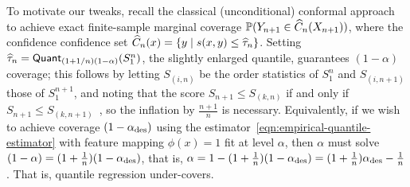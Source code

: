 \documentclass{article}
\newcommand{\scorefunc}{s}
\newcommand{\scoreval}{\scorefunc}
\newcommand{\scorerv}{S}
\newcommand{\quant}{\mathsf{Quant}}
\begin{document}
\newcommand{\alphadesired}{\alpha_{\textup{des}}}

To motivate our tweaks, recall the classical (unconditional) conformal
approach to achieve exact finite-sample marginal coverage $\mathbb{P}(Y_{n + 1} \in
\widehat{C}_n(X_{n + 1}))$, where the confidence confidence set $\what{C}_n(x)
= \{y \mid \scoreval(x, y) \le \what{\tau}_n\}$.
%
Setting $\what{\tau}_n = \quant_{(1 + 1/n) (1 - \alpha)}(\scorerv_1^n)$, the
slightly enlarged quantile, guarantees $(1 - \alpha)$ coverage; this follows
by letting $\scorerv_{(i,n)}$ be the order statistics of $\scorerv_1^n$ and
$\scorerv_{(i, n + 1)}$ those of $\scorerv_1^{n + 1}$, and noting that the
score $\scorerv_{n + 1} \le \scorerv_{(k,n)}$ if and only if $\scorerv_{n +
  1} \le \scorerv_{(k , n + 1)}$~\cite[Lemma 2]{RomanoPaCa19}, so the
inflation by $\frac{n+1}{n}$ is necessary.
%
Equivalently, if we wish to achieve coverage $(1 - \alphadesired)$ using the
estimator~\eqref{eqn:empirical-quantile-estimator} with feature mapping
$\phi(x) = 1$ fit at level $\alpha$, then $\alpha$ must solve $(1 - \alpha)
= (1 + \frac{1}{n}) (1 - \alphadesired)$, that is, $\alpha = 1 - (1 +
\frac{1}{n})(1 - \alphadesired) = (1 + \frac{1}{n}) \alphadesired -
\frac{1}{n}$.
%
That is, quantile regression under-covers.
\end{document}
